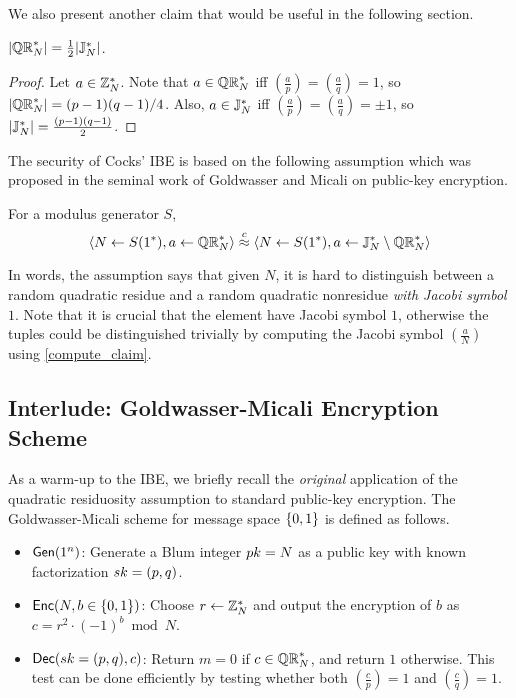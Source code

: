 \documentclass[11pt]{article}
\begin{document}
We also present another claim that would be useful in the following
section.

\begin{claim}
  \label{equal_claim}
  $\lvert\mathbb{QR}_{N}^*\rvert = \tfrac12 \lvert\mathbb{J}_N^*\rvert$.
\end{claim}

\begin{proof}
  Let $a \in \mathbb{Z}_N^*$.  Note that $a \in \mathbb{QR}_{N}^*$ iff $\left(
    \frac{a}{p} \right) = \left( \frac{a}{q} \right) = 1$, so
  $\lvert\mathbb{QR}_{N}^{*}\rvert = (p-1)(q-1)/4$.  Also, $a \in \mathbb{J}_N^*$ iff $\left(
    \frac{a}{p}\right) = \left( \frac{a}{q}\right) = \pm 1$, so
  $\lvert\mathbb{J}_N^*\rvert = \frac{(p-1)(q-1)}{2}$.
\end{proof}

The security of Cocks' IBE is based on the following assumption which
was proposed in the seminal work of Goldwasser and Micali on
public-key encryption.

\begin{conjecture}
  \label{QR_conjecture}
  For a modulus generator $S$,
  \[ \left\langle N \leftarrow S(1^*), a \leftarrow \mathbb{QR}_{N}^*
  \right\rangle \stackrel{c}{\approx} \left\langle N \leftarrow S(1^*), a
    \leftarrow \mathbb{J}_N^* \setminus \mathbb{QR}_{N}^* \right\rangle\]
\end{conjecture}

In words, the assumption says that given $N$, it is hard to
distinguish between a random quadratic residue and a random quadratic
nonresidue \emph{with Jacobi symbol $1$}.  Note that it is crucial
that the element have Jacobi symbol $1$, otherwise the tuples could be
distinguished trivially by computing the Jacobi symbol $\left(
  \frac{a}{N} \right)$ using \cref{compute_claim}.

\subsection{Interlude: Goldwasser-Micali Encryption Scheme}
\label{sec:goldw-micali-pkc}

As a warm-up to the IBE, we briefly recall the \emph{original}
application of the quadratic residuosity assumption to standard
public-key encryption.  The Goldwasser-Micali scheme for message space
$\{0,1\}$ is defined as follows.
\begin{itemize}
\item $\mathsf{Gen}(1^n)$: Generate a Blum integer $pk = N$ as a public
  key with known factorization $sk = (p,q)$.
\item $\mathsf{Enc}(N,b \in \{0,1\})$: Choose $r \gets \mathbb{Z}_N^*$ and output the
  encryption of $b$ as $c = r^2 \cdot (-1)^b \bmod N$.
\item $\mathsf{Dec}(sk = (p,q), c)$: Return $m = 0$ if $c \in \mathbb{QR}_{N}^*$, and
  return $1$ otherwise.  This test can be done efficiently by testing
  whether both $\left( \frac{c}{p} \right) = 1$ and $\left(
    \frac{c}{q} \right) = 1$.
\end{itemize}
\end{document}
